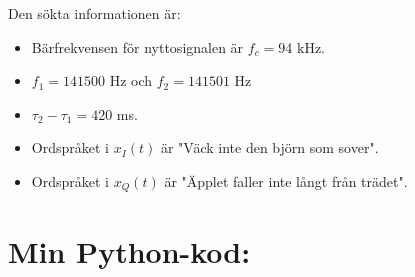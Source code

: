 \documentclass[10pt,twocolumn]{article}
\begin{document}
Den sökta informationen är:
\begin{itemize}
\item Bärfrekvensen för nyttosignalen är $f_c=94$ kHz.
\item $f_1=141500$ Hz och $f_2=141501$ Hz
\item $\tau_2 - \tau_1 = 420$ ms.
\item Ordspråket i $x_I(t)$ är "Väck inte den björn som sover".
\item Ordspråket i $x_Q(t)$ är "Äpplet faller inte långt från trädet".
\end{itemize}

\clearpage

\onecolumn
\section*{Min Python-kod:}

\end{document}
